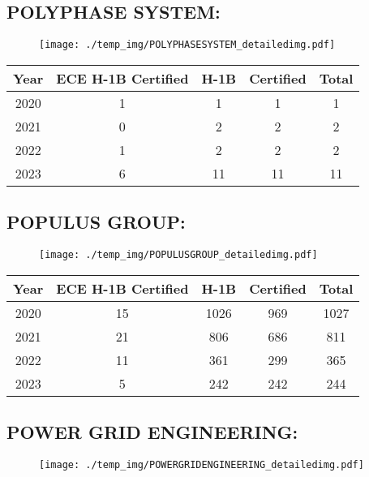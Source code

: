 \documentclass{article}%
\begin{document}
%
\newpage%
\subsection{POLYPHASE SYSTEM:}%
\label{subsec:POLYPHASESYSTEM}%
\label{POLYPHASESYSTEMdetailed}%


\begin{figure}[htbp]%
\centering%
\texttt{[image: ./temp\_img/POLYPHASESYSTEM\_detailedimg.pdf]}%
\end{figure}

%
\begin{longtable}{c|c|c|c|c}%
\hline%
Year&ECE H{-}1B Certified&H{-}1B&Certified&Total\\%
\hline%
2020&1&1&1&1\\%
\hline%
2021&0&2&2&2\\%
\hline%
2022&1&2&2&2\\%
\hline%
2023&6&11&11&11\\%
\hline%
\end{longtable}

%
\newpage%
\subsection{POPULUS GROUP:}%
\label{subsec:POPULUSGROUP}%
\label{POPULUSGROUPdetailed}%


\begin{figure}[htbp]%
\centering%
\texttt{[image: ./temp\_img/POPULUSGROUP\_detailedimg.pdf]}%
\end{figure}

%
\begin{longtable}{c|c|c|c|c}%
\hline%
Year&ECE H{-}1B Certified&H{-}1B&Certified&Total\\%
\hline%
2020&15&1026&969&1027\\%
\hline%
2021&21&806&686&811\\%
\hline%
2022&11&361&299&365\\%
\hline%
2023&5&242&242&244\\%
\hline%
\end{longtable}

%
\newpage%
\subsection{POWER GRID ENGINEERING:}%
\label{subsec:POWERGRIDENGINEERING}%
\label{POWERGRIDENGINEERINGdetailed}%


\begin{figure}[htbp]%
\centering%
\texttt{[image: ./temp\_img/POWERGRIDENGINEERING\_detailedimg.pdf]}%
\end{figure}
\end{document}
